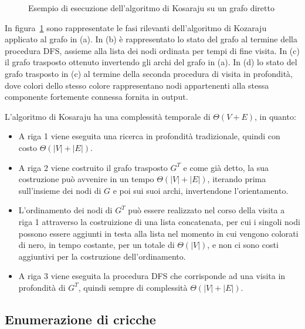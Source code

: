 \begin{figure}
    \resizebox{!}{4cm}{
        }
    \resizebox{!}{4cm}{
        }
    \caption{Esempio di esecuzione dell'algoritmo di Kosaraju su un grafo diretto}
    \label{fig:kozaraju_example}
\end{figure}

In figura~\ref{fig:kozaraju_example} sono rappresentate le fasi rilevanti dell'algoritmo di Kozaraju
applicato al grafo in (a).
In (b) \`e rappresentato lo stato del grafo al termine della procedura DFS, assieme alla lista dei nodi ordinata
per tempi di fine visita.
In (c) il grafo trasposto ottenuto invertendo gli archi del grafo in (a).
In (d) lo stato del grafo trasposto in (c) al termine della seconda procedura di visita in
profondit\`a, dove colori dello stesso colore rappresentano nodi appartenenti alla stessa componente fortemente
connessa fornita in output.


L'algoritmo di Kosaraju ha una complessit\`a temporale di $\Theta(V + E)$, in quanto:
\begin{itemize}
    \item A riga 1 viene eseguita una ricerca in profondit\`a tradizionale, quindi con costo $\Theta(|V| + |E|)$.
    \item A riga 2 viene costruito il grafo trasposto $G^T$ e come gi\`a detto, la sua costruzione pu\`o avvenire in
    un tempo $\Theta(|V| + |E|)$, iterando prima sull'insieme dei nodi di $G$ e poi sui suoi archi, invertendone
    l'orientamento.
    \item L'ordinamento dei nodi di $G^T$ pu\`o essere realizzato nel corso della visita a riga 1 attraverso la
    costruizione di una lista concatenata, per cui i singoli nodi possono essere aggiunti in testa alla lista nel
    momento in cui vengono colorati di nero, in tempo costante, per un totale di $\Theta(|V|)$, e non ci sono costi
    aggiuntivi per la costruzione dell'ordinamento.
    \item A riga 3 viene eseguita la procedura DFS che corrisponde ad una visita in profondit\`a di $G^T$, quindi
    sempre di complessit\`a $\Theta(|V| + |E|)$.
\end{itemize}

\subsection{Enumerazione di cricche}\label{sec:enumerazione-di-cricche}

